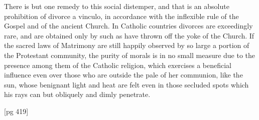 There is but one remedy to this social distemper,
and that is an absolute prohibition of divorce
a vinculo, in accordance with the inflexible
rule of the Gospel and of the ancient Church. In
Catholic countries divorces are exceedingly rare,
and are obtained only by such as have thrown
off the yoke of the Church. If the sacred laws
of Matrimony are still happily observed by so
large a portion of the Protestant community, the
purity of morals is in no small measure due to
the presence among them of the Catholic religion,
which exercises a beneficial influence even over
those who are outside the pale of her communion,
like the sun, whose benignant light and heat are
felt even in those secluded spots which his rays
can but obliquely and dimly penetrate.

[pg 419]
